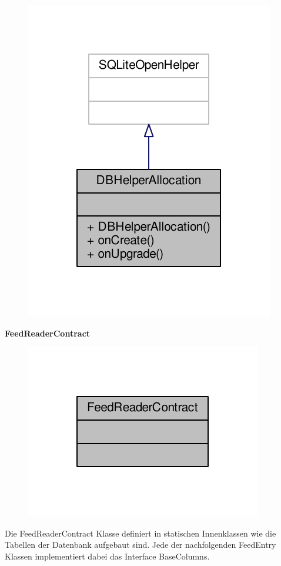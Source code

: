 \begin{figure}[H]
	\includegraphics[scale = 1]{res/umlClasses/d_b_helper_allocation__coll__graph.pdf}
	\centering
\end{figure}


\textbf{FeedReaderContract}
\begin{figure}[H]
	\includegraphics[scale = 1]{res/umlClasses/feed_reader_contract__coll__graph.pdf}
	\centering
\end{figure}
Die FeedReaderContract Klasse definiert in statischen Innenklassen wie die Tabellen der Datenbank aufgebaut sind. Jede der nachfolgenden FeedEntry Klassen implementiert dabei das Interface BaseColumns.


